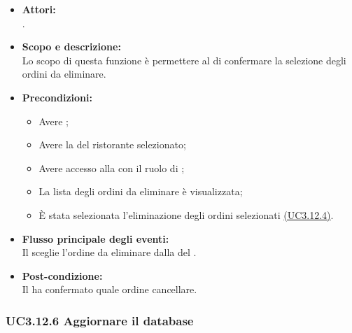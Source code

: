 \begin{itemize}
	\item \textbf{Attori:}
	\\.
	\item \textbf{Scopo e descrizione:} 
	\\Lo scopo di questa funzione è permettere al  di confermare la selezione degli ordini da eliminare.
	\item \textbf{Precondizioni:}
	\begin{itemize}
		\item Avere ;
		\item Avere la  del ristorante selezionato;
		\item Avere accesso alla  con il ruolo di ;
		\item La lista degli ordini da eliminare è visualizzata;
		\item È stata selezionata l'eliminazione degli ordini selezionati \hyperref[UC3.12.4]{(UC3.12.4)}.
	\end{itemize}
	\item \textbf{Flusso principale degli eventi:}
	\\Il {} sceglie l'ordine da eliminare dalla  del .
	\item \textbf{Post-condizione:}
	\\Il {} ha confermato quale ordine cancellare.
\end{itemize}

\subsubsection{UC3.12.6 Aggiornare il database} \label{UC3.12.6}

